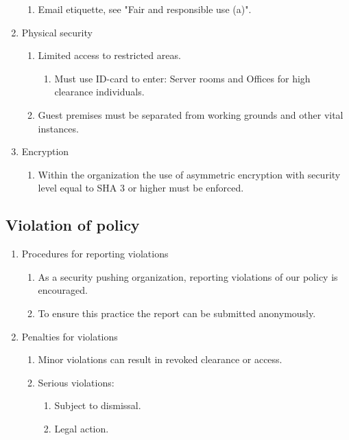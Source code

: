 \begin{enumerate}
\begin{enumerate}
    \item Email etiquette, see "Fair and responsible use (a)".
  \end{enumerate}
  \item Physical security
  \begin{enumerate}
    \item Limited access to restricted areas.
    \begin{enumerate}
      \item Must use ID-card to enter: Server rooms and Offices for high clearance individuals.
    \end{enumerate}
    \item Guest premises must be separated from working grounds and other vital instances.
  \end{enumerate}
  \item Encryption
  \begin{enumerate}
    \item Within the organization the use of asymmetric encryption with security level equal to SHA 3 or higher must be enforced.
  \end{enumerate}
\end{enumerate}

\subsection{Violation of policy}

\begin{enumerate}
  \item Procedures for reporting violations
  \begin{enumerate}
    \item As a security pushing organization, reporting violations of our policy is encouraged.
    \item To ensure this practice the report can be submitted anonymously.
  \end{enumerate}
    \item Penalties for violations
  \begin{enumerate}
    \item Minor violations can result in revoked clearance or access.
    \item Serious violations:
    \begin{enumerate}
      \item Subject to dismissal.
      \item Legal action.
    \end{enumerate}
  \end{enumerate}
\end{enumerate}

